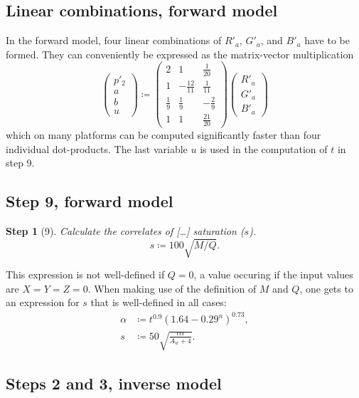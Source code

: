 \documentclass[twocolumn]{scrartcl}
\theoremstyle{named}
\newtheorem*{step}{Step}
\begin{document}
\subsection{Linear combinations, forward model}

In the forward model, four linear combinations of $R'_a$, $G'_a$, and $B'_a$
have to be formed. They can conveniently be expressed as the matrix-vector
multiplication
\[
  \begin{pmatrix}
    p'_2\\[0.5ex]
    a\\[0.5ex]
    b\\[0.5ex]
    u
  \end{pmatrix}
  \coloneqq
  \begin{pmatrix}
    2 & 1 & \tfrac{1}{20}\\[0.5ex]
    1 & -\tfrac{12}{11} & \tfrac{1}{11}\\[0.5ex]
    \tfrac{1}{9} & \tfrac{1}{9} & -\tfrac{2}{9}\\[0.5ex]
    1 & 1 & \tfrac{21}{20}
  \end{pmatrix}
  \begin{pmatrix}
    R'_a\\G'_a\\B'_a
  \end{pmatrix}
\]
which on many platforms can be computed significantly faster than four
individual dot-products.
The last variable $u$ is used in the computation of $t$ in step 9.



\subsection{Step 9, forward model}

\begin{step}[9]
  Calculate the correlates of [\dots] saturation ($s$).
  \[
    s \coloneqq 100 \sqrt{M/Q}.
  \]
\end{step}
This expression is not well-defined if $Q=0$, a value occuring if the
input values are $X=Y=Z=0$. When making use of the definition of $M$ and $Q$,
one gets to an expression for $s$ that is well-defined in all cases:
\begin{align}
  \label{eq:alpha}
  \alpha&\coloneqq t^{0.9} {(1.64-0.29^n)}^{0.73},\\
  \nonumber
  s &\coloneqq 50 \sqrt{\frac{c\alpha}{A_w + 4}}.
\end{align}


\subsection{Steps 2 and 3, inverse model}
\end{document}
